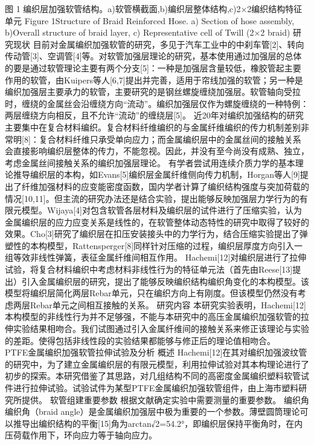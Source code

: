 \documentclass[12pt,a4paper]{book}
\begin{document}
图 1 编织层加强软管结构。a)软管横截面,b)编织层整体结构,c)2×2编织结构特征单元
Figure 1Structure of Braid Reinforced Hose. a) Section of hose assembly, b)Overall structure of braid layer, c) Representative cell of Twill (2×2 braid)
研究现状
目前对金属编织加强软管的研究，多见于汽车工业中的中刹车管[2]、转向传动管[3]、空调管[4]等。对软管加强层理论的研究，基本使用通过加强层的总体的要是通过软管理论主要有两个分支[5]：一种是加强层含量较低，橡胶管起主要作用的软管，由Kuipers等人[6,7]提出并完善，适用于帘线加强的软管；另一种是编织加强层主要承力的软管，主要研究的是钢丝螺旋缠绕加强层。软管轴向受拉时，缠绕的金属丝会沿缠绕方向“流动”。编织加强层仅作为螺旋缠绕的一种特例：两层缠绕方向相反，且不允许“流动”的缠绕层[5]。
近20年对编织加强结构的研究主要集中在复合材料编织。复合材料纤维编织的与金属纤维编织的传力机制差别非常明[8]：复合材料纤维只承受单向应力；而金属编织层中的金属丝间的接触关系会直接影响编织层整体的传力，不能忽视。因此，并没有至今尚没有成熟、独立，考虑金属丝间接触关系的编织加强层理论。
有学者尝试用连续介质力学的基本理论推导编织层的本构，如Evans[5]编织层金属纤维侧向传力机制，Horgan等人[9]提出了纤维加强材料的应变能密度函数，国内学者计算了编织结构强度与突加荷载的情况[10,11]。但主流的研究办法还是结合实验，提出能够反映加强层力学行为的有限元模型。Wijaya[4]对包含软管各层材料及编织层的试件进行了压缩实验，认为金属编织层的应力应变关系是线性的，在软管整体动态特性的研究中取得了较好的效果。Cho[3]研究了编织层在扣压安装接头中的力学行为，结合压缩实验提出了弹塑性的本构模型，Rattensperger[8]同样针对压缩的过程，编织层厚度方向引入一组等效非线性弹簧，表征金属纤维间相互作用。
Hachemi[12]对编织层进行了拉伸试验，将复合材料编织中考虑材料非线性行为的特征单元法（首先由Reese[13]提出）引入金属编织层的研究，提出了能够反映编织结构编织角变化的本构模型。该模型将编织层简化两层Rebar单元，只在编织方向上有刚度。但该模型仍然没有考虑两层Rebar单元之间相互接触的关系。
研究内容
本研究实验表明，Hachemi[12]本构模型的非线性行为并不足够强，不能与本研究中的高压金属编织加强软管的拉伸实验结果相吻合。我们试图通过引入金属纤维间的接触关系来修正该理论与实验的差距。使得包括非线性段的实验结果都能够与修正后的理论值相吻合。
 
PTFE金属编织加强软管拉伸试验及分析
概述
Hachemi[12]在其对编织加强波纹管的研究中，为了建立金属编织层的有限元模型，利用拉伸试验对其本构理论进行了初步的探索。本研究借鉴了其思路，对几组结构不同的高密度金属编织塑料软管试件进行拉伸试验。试验试件为某型PTFE金属编织加强软管组件，由上海市塑料研究所提供。
软管组建重要参数
根据文献确定实验中需要测量的重要参数。
编织角
编织角（braid angle）是金属编织加强层中极为重要的一个参数。薄壁圆筒理论可以推导出编织结构的平衡[15]角为arctan√2=54.2°，即编织层保持平衡角时，在内压荷载作用下，环向应力等于轴向应力。
 	 	 
\end{document}
